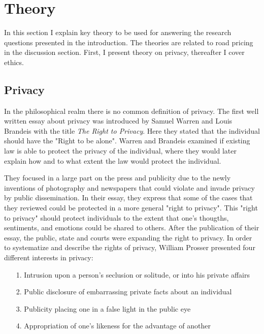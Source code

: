 \section{Theory}
In this section I explain key theory to be used for answering the research questions presented in the introduction. The theories are related to road pricing in the discussion section. First, I present theory on privacy, thereafter I cover ethics. 

\subsection{Privacy}
In the philosophical realm there is no common definition of privacy. 
The first well written essay about privacy was introduced by Samuel Warren and Louis Brandeis with the title \textit{The Right to Privacy}. Here they stated that the individual should have the "Right to be alone". Warren and Brandeis examined if existing law is able to protect the privacy of the individual, where they would later explain how and to what extent the law would protect the individual. 

They focused in a large part on the press and publicity due to the newly inventions of photography and newspapers that could violate and invade privacy by public dissemination. In their essay, they express that some of the cases that they reviewed could be protected in a more general "right to privacy". This "right to privacy" should protect individuals to the extent that one's thougths, sentiments, and emotions could be shared to others. After the publication of their essay, the public, state and courts were expanding the right to privacy. In order to systematize and describe the rights of privacy, William Prosser presented four different interests in privacy:
\begin{itemize}
    \item[1.] Intrusion upon a person's seclusion or solitude, or into his private affairs
    \item[2.] Public disclosure of embarrassing private facts about an individual 
    \item[3.] Publicity placing one in a false light in the public eye
    \item[4.] Appropriation of one's likeness for the advantage of another  
\end{itemize}

